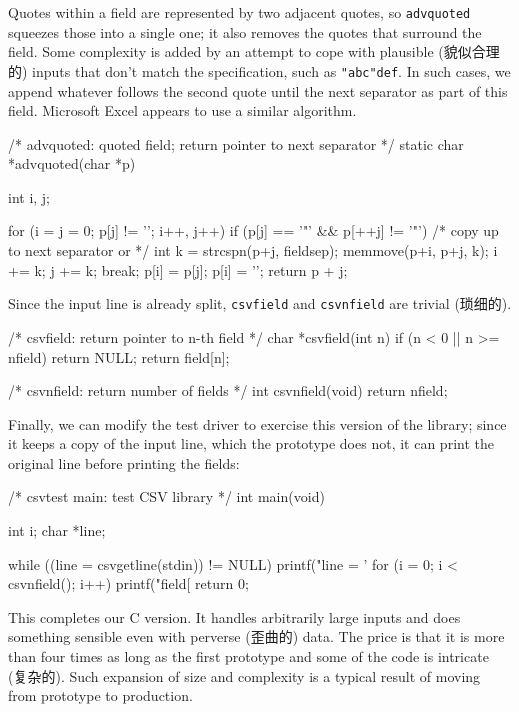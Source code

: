 Quotes within a field are represented by two adjacent quotes, so
\verb'advquoted' squeezes those into a single one; it also removes the
quotes that surround the field.  Some complexity is added by an attempt to
cope with plausible (貌似合理的) inputs that don't match the specification,
such as \verb'"abc"def'. In such cases, we append whatever follows the
second quote until the next separator as part of this field.  Microsoft
Excel appears to use a similar algorithm.
\begin{wellcode}
    /* advquoted: quoted field; return pointer to next separator */
    static char *advquoted(char *p)
    {
        int i, j;

        for (i = j = 0; p[j] != '\0'; i++, j++) {
            if (p[j] == '"' && p[++j] != '"') {
                /* copy up to next separator or \0 */
                int k = strcspn(p+j, fieldsep);
                memmove(p+i, p+j, k);
                i += k;
                j += k;
                break;
            }
            p[i] = p[j];
        }
        p[i] = '\0';
        return p + j;
    }
\end{wellcode}

Since the input line is already split, \verb'csvfield' and \verb'csvnfield'
are trivial (琐细的).
\begin{wellcode}
    /* csvfield: return pointer to n-th field */
    char *csvfield(int n)
    {
        if (n < 0 || n >= nfield)
            return NULL;
        return field[n];
    }

    /* csvnfield: return number of fields */
    int csvnfield(void)
    {
        return nfield;
    }
\end{wellcode}

Finally, we can modify the test driver to exercise this version of the
library; since it keeps a copy of the input line, which the prototype does
not, it can print the original line before printing the fields:
\begin{wellcode}
    /* csvtest main: test CSV library */
    int main(void)
    {
        int     i;
        char    *line;

        while ((line = csvgetline(stdin)) != NULL) {
            printf("line = '%
            for (i = 0; i < csvnfield(); i++)
                printf("field[%
        }
        return 0;
    }
\end{wellcode}

This completes our C version. It handles arbitrarily large inputs and does
something sensible even with perverse (歪曲的) data. The price is that it
is more than four times as long as the first prototype and some of the code
is intricate (复杂的). Such expansion of size and complexity is a typical
result of moving from prototype to production.

